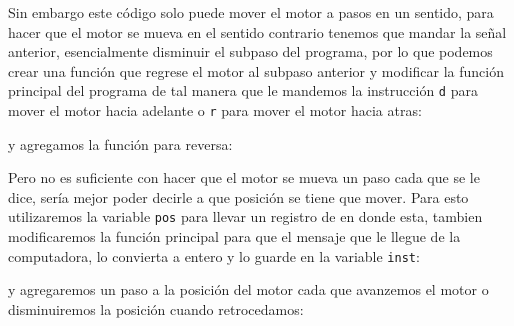 		\begin{fullwidth}
			\begin{multicols}{3}
				
			\end{multicols}
		\end{fullwidth}

		Sin embargo este código solo puede mover el motor a pasos en un sentido, para hacer que el motor se mueva en el sentido contrario tenemos que mandar la señal anterior, esencialmente disminuir el subpaso del programa, por lo que podemos crear una función que regrese el motor al subpaso anterior y modificar la función principal del programa de tal manera que le mandemos la instrucción \texttt{d} para mover el motor hacia adelante o \texttt{r} para mover el motor hacia atras:

		\begin{multicols}{2}
			
		\end{multicols}

		y agregamos la función para reversa:

		\begin{fullwidth}
			\begin{multicols}{3}
				
			\end{multicols}
		\end{fullwidth}

		\newpage

		Pero no es suficiente con hacer que el motor se mueva un paso cada que se le dice, sería mejor poder decirle a que posición se tiene que mover. Para esto utilizaremos la variable \texttt{pos} para llevar un registro de en donde esta, tambien modificaremos la función principal para que el mensaje que le llegue de la computadora, lo convierta a entero y lo guarde en la variable \texttt{inst}:

			\begin{multicols}{2}
				
			\end{multicols}

		y agregaremos un paso a la posición del motor cada que avanzemos el motor o disminuiremos la posición cuando retrocedamos:

